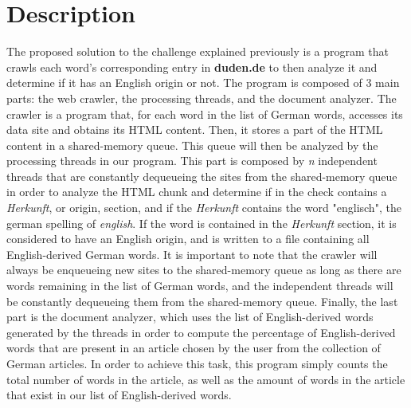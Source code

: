 \documentclass{article}
\begin{document}
\section{Description}
The proposed solution to the challenge explained previously is a program that crawls each word's corresponding entry in \textbf{duden.de} to then analyze it and determine if it has an English origin or not. The program is composed of 3 main parts: the web crawler, the processing threads, and the document analyzer.
The crawler is a program that, for each word in the list of German words, accesses its data site and obtains its HTML content. Then, it stores a part of the HTML content in a shared-memory queue. This queue will then be analyzed by the processing threads in our program. This part is composed by \textit{n} independent threads that are constantly dequeueing the sites from the shared-memory queue in order to analyze the HTML chunk and determine if in the check contains a \textit{Herkunft}, or origin, section, and if the \textit{Herkunft} contains the word "englisch", the german spelling of \textit{english}. If the word is contained in the \textit{Herkunft} section, it is considered to have an English origin, and is written to a file containing all English-derived German words. It is important to note that the crawler will always be enqueueing new sites to the shared-memory queue as long as there are words remaining in the list of German words, and the independent threads will be constantly dequeueing them from the shared-memory queue.
Finally, the last part is the document analyzer, which uses the list of English-derived words generated by the threads in order to compute the percentage of English-derived words that are present in an article chosen by the user from the collection of German articles. In order to achieve this task, this program simply counts the total number of words in the article, as well as the amount of words in the article that exist in our list of English-derived words.
\end{document}
